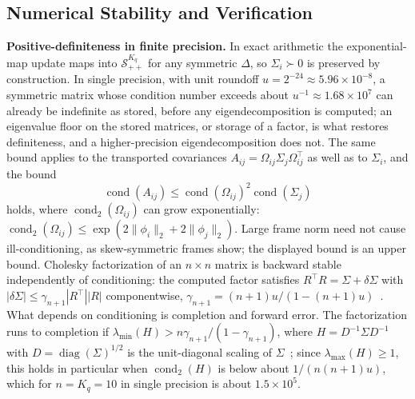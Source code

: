 \subsection*{Numerical Stability and Verification}

\textbf{Positive-definiteness in finite precision.} In exact arithmetic the exponential-map update maps into $\mathcal{S}_{++}^{K_q}$ for any symmetric $\Delta$, so $\Sigma_i \succ 0$ is preserved by construction. In single precision, with unit roundoff $u = 2^{-24} \approx 5.96 \times 10^{-8}$, a symmetric matrix whose condition number exceeds about $u^{-1} \approx 1.68 \times 10^{7}$ can already be indefinite as stored, before any eigendecomposition is computed; an eigenvalue floor on the stored matrices, or storage of a factor, is what restores definiteness, and a higher-precision eigendecomposition does not. The same bound applies to the transported covariances $A_{ij} = \Omega_{ij}\Sigma_j\Omega_{ij}^\top$ as well as to $\Sigma_i$, and the bound
\begin{equation}
\operatorname{cond}(A_{ij}) \le \operatorname{cond}(\Omega_{ij})^2\operatorname{cond}(\Sigma_j)
\end{equation}
holds, where $\operatorname{cond}_2(\Omega_{ij})$ can grow exponentially: $\operatorname{cond}_2(\Omega_{ij})\le\exp(2\|\phi_i\|_2+2\|\phi_j\|_2)$. Large frame norm need not cause ill-conditioning, as skew-symmetric frames show; the displayed bound is an upper bound. Cholesky factorization of an $n \times n$ matrix is backward stable independently of conditioning: the computed factor satisfies $R^\top R = \Sigma + \delta\Sigma$ with $|\delta\Sigma| \le \gamma_{n+1}|R^\top||R|$ componentwise, $\gamma_{n+1} = (n+1)u/(1 - (n+1)u)$~\cite[Thm.~10.3]{Higham2002}. What depends on conditioning is completion and forward error. The factorization runs to completion if $\lambda_{\min}(H) > n\gamma_{n+1}/(1 - \gamma_{n+1})$, where $H = D^{-1}\Sigma D^{-1}$ with $D = \operatorname{diag}(\Sigma)^{1/2}$ is the unit-diagonal scaling of $\Sigma$~\cite[Thm.~10.7]{Higham2002}; since $\lambda_{\max}(H) \ge 1$, this holds in particular when $\operatorname{cond}_2(H)$ is below about $1/(n(n+1)u)$, which for $n = K_q = 10$ in single precision is about $1.5 \times 10^5$.

